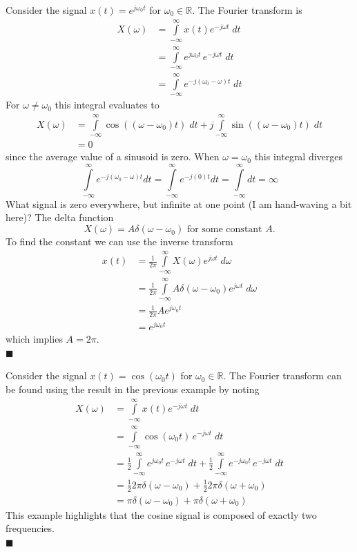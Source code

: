 \begin{example}
Consider the signal $x(t) = e^{j\omega_0 t}$ for $\omega_0\in \mathbb{R}$.  The Fourier transform is
  \begin{align*}
    X(\omega) &= \int\limits_{-\infty}^{\infty} x(t) e^{-j\omega t}\; dt\\
    &= \int\limits_{-\infty}^{\infty}  e^{j\omega_0 t} \, e^{-j\omega t}\; dt\\
    &= \int\limits_{-\infty}^{\infty}  e^{-j(\omega_0-\omega) t}\; dt
  \end{align*}
  For $\omega \neq \omega_0$ this integral evaluates to
  \begin{align*}
    X(\omega) &= \int\limits_{-\infty}^{\infty}  \cos((\omega-\omega_0) t)\; dt + j \int\limits_{-\infty}^{\infty}  \sin((\omega-\omega_0) t)\; dt\\
    &= 0
  \end{align*}
  since the average value of a sinusoid is zero. When $\omega = \omega_0$ this integral diverges
  \[
  \int\limits_{-\infty}^{\infty}  e^{-j(\omega_0-\omega) t}dt = \int\limits_{-\infty}^{\infty}  e^{-j(0) t} dt= \int\limits_{-\infty}^{\infty} dt = \infty 
  \]
  What signal is zero everywhere, but infinite at one point (I am hand-waving a bit here)? The delta function
  \[
  X(\omega) = A\delta(\omega-\omega_0) \mbox{ for some constant } A.
  \]
  To find the constant we can use the inverse transform
  \begin{align*}
    x(t) &= \frac{1}{2\pi} \int\limits_{-\infty}^{\infty} X(\omega)e^{j\omega t}\; d\omega\\
    &= \frac{1}{2\pi} \int\limits_{-\infty}^{\infty}  A\delta(\omega-\omega_0) e^{j\omega t}\; d\omega\\
    &= \frac{1}{2\pi} A e^{j\omega_0 t}\\
    &= e^{j\omega_0 t}
  \end{align*}
  which implies $A = 2\pi$.\\
  $\blacksquare$
\end{example}

\begin{example}
  Consider the signal $x(t) = \cos(\omega_0 t)$ for $\omega_0\in \mathbb{R}$.  The Fourier transform can be found using the result in the previous example by noting
  \begin{align*}
    X(\omega) &= \int\limits_{-\infty}^{\infty} x(t) e^{-j\omega t}\; dt\\
    &= \int\limits_{-\infty}^{\infty}  \cos(\omega_0 t) \, e^{-j\omega t}\; dt\\
    &= \frac{1}{2}\int\limits_{-\infty}^{\infty}   e^{j\omega_0 t} \, e^{-j\omega t}\; dt + \frac{1}{2}\int\limits_{-\infty}^{\infty} e^{-j\omega_0 t} \, e^{-j\omega t}\; dt\\
    &= \frac{1}{2} 2\pi \delta(\omega-\omega_0) + \frac{1}{2} 2\pi \delta(\omega+\omega_0)\\
    &= \pi \delta(\omega-\omega_0) + \pi \delta(\omega+\omega_0)
  \end{align*}
  This example highlights that the cosine signal is composed of exactly two frequencies.\\
  $\blacksquare$
\end{example}

